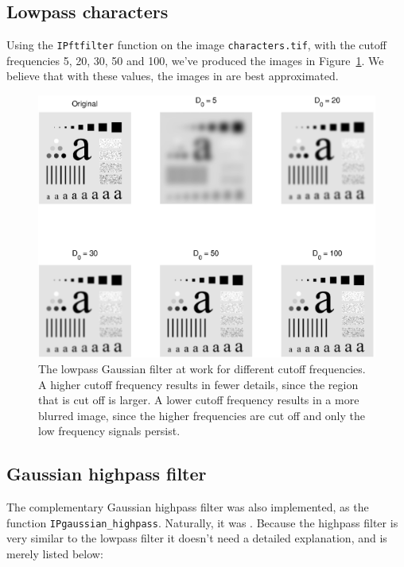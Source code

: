 \subsection{Lowpass characters}
Using the \texttt{IPftfilter} function on the image \texttt{characters.tif}, with the cutoff frequencies 5, 20, 30, 50 and 100, we've produced the images in Figure~\ref{fig:lowChars}.
We believe that with these values, the images in \cite[Figure~4.48]{gonzalez2002digital} are best approximated.
\begin{figure}[ht]
 \centering
 \includegraphics[width=\linewidth]{characters_low_pass.eps}
 \caption{
		The lowpass Gaussian filter at work for different cutoff frequencies.
		A higher cutoff frequency results in fewer details, since the region that is cut off is larger.
		A lower cutoff frequency results in a more blurred image, since the higher frequencies are cut off and only the low frequency signals persist.
	}
 \label{fig:lowChars}
\end{figure}

\clearpage

\subsection{Gaussian highpass filter}
The complementary Gaussian highpass filter was also implemented, as the function \texttt{IPgaussian\_highpass}.
Naturally, it was .
Because the highpass filter is very similar to the lowpass filter it doesn't need a detailed explanation, and is merely listed below:

